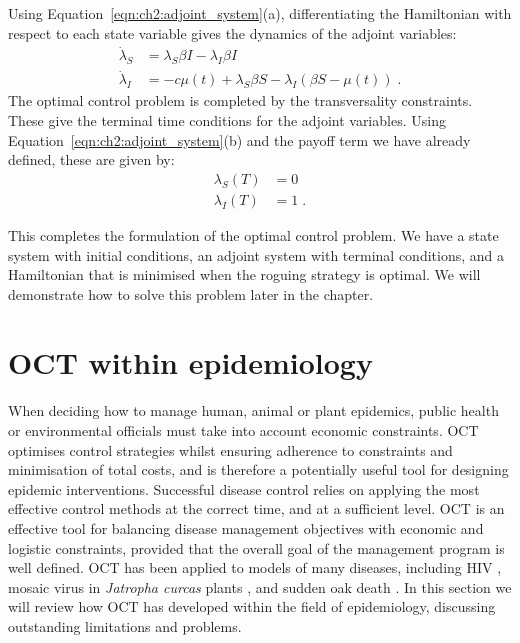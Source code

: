 \begin{example}
    Using Equation~\ref{eqn:ch2:adjoint_system}(a), differentiating the Hamiltonian with respect to each state variable gives the dynamics of the adjoint variables:
    \begin{subequations}
        \begin{align}
            \dot{\lambda}_S &= \lambda_S\beta{}I - \lambda_I\beta{}I\\
            \dot{\lambda}_I &= -c\mu(t) + \lambda_S\beta{}S - \lambda_I\left(\beta{}S - \mu(t)\right)\;.
        \end{align}
    \end{subequations}
    The optimal control problem is completed by the transversality constraints. These give the terminal time conditions for the adjoint variables. Using Equation~\ref{eqn:ch2:adjoint_system}(b) and the payoff term we have already defined, these are given by:
    \begin{subequations}
        \begin{align}
            \lambda_S(T) &= 0\\
            \lambda_I(T) &= 1\;.
        \end{align}
    \end{subequations}

    This completes the formulation of the optimal control problem. We have a state system with initial conditions, an adjoint system with terminal conditions, and a Hamiltonian that is minimised when the roguing strategy is optimal. We will demonstrate how to solve this problem later in the chapter.
\end{example}

\section{OCT within epidemiology}\label{sec:ch2:oct_in_epidem}

When deciding how to manage human, animal or plant epidemics, public health or environmental officials must take into account economic constraints. OCT optimises control strategies whilst ensuring adherence to constraints and minimisation of total costs, and is therefore a potentially useful tool for designing epidemic interventions. Successful disease control relies on applying the most effective control methods at the correct time, and at a sufficient level. OCT is an effective tool for balancing disease management objectives with economic and logistic constraints, provided that the overall goal of the management program is well defined. OCT has been applied to models of many diseases, including HIV \citep{kirschner_optimal_1997}, mosaic virus in \emph{Jatropha curcas} plants \citep{al_basir_impact_2017}, and sudden oak death \citep{ndeffo_mbah_optimization_2010}. In this section we will review how OCT has developed within the field of epidemiology, discussing outstanding limitations and problems.

